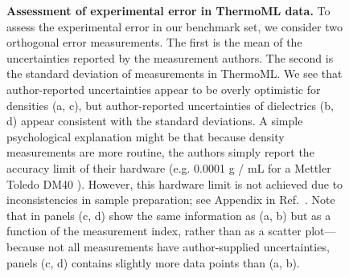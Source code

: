 \documentclass[aps,pre,twocolumn,nofootinbib,superscriptaddress,linenumbers]{revtex4-1}
\begin{document}
\begin{figure}
\caption{{\bf Assessment of experimental error in ThermoML data.}
To assess the experimental error in our benchmark set, we consider two orthogonal error measurements.  
The first is the mean of the uncertainties reported by the measurement authors.  
The second is the standard deviation of measurements in ThermoML.   
We see that author-reported uncertainties appear to be overly optimistic for densities (a, c), but author-reported uncertainties of dielectrics (b, d) appear consistent with the standard deviations.  
A simple psychological explanation might be that because density measurements are more routine, the authors simply report the accuracy limit of their hardware (e.g. 0.0001 g / mL for a Mettler Toledo DM40 \cite{mettlertoledo}).  
However, this hardware limit is not achieved due to inconsistencies in sample preparation; see Appendix in Ref.~\cite{chirico2013improvement}.  
Note that in panels (c, d) show the same information as (a, b) but as a function of the measurement index, rather than as a scatter plot---because not all measurements have author-supplied uncertainties, panels (c, d) contains slightly more data points than (a, b).  
}
\label{figure:ErrorAnalysis}

\end{figure}
\end{document}

